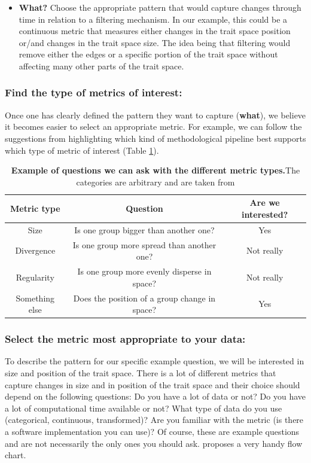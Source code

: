 \documentclass[12pt,letterpaper]{article}
\begin{document}
\begin{itemize}
    \item \textbf{What?} Choose the appropriate pattern that would capture changes through time in relation to a filtering mechanism. In our example, this could be a continuous metric that measures either changes in the trait space position or/and changes in the trait space size. The idea being that filtering would remove either the edges or a specific portion of the trait space without affecting many other parts of the trait space.
\end{itemize}


\subsubsection{Find the type of metrics of interest:}

Once one has clearly defined the pattern they want to capture (\textbf{what}), we believe it becomes easier to select an appropriate metric.
For example, we can follow the suggestions from \cite{mammola2021concepts} highlighting which kind of methodological pipeline best supports which type of metric of interest (Table \ref{Tab:box2}).

\begin{table}
\center
\begin{tabular}{c | c | c}
\textbf{Metric type}  & \textbf{Question} & \textbf{Are we interested?}\\
\hline
Size & Is one group bigger than another one? & Yes \\
Divergence & Is one group more spread than another one? & Not really \\
Regularity & Is one group more evenly disperse in space? & Not really \\
Something else & Does the position of a group change in space? & Yes \\
\end{tabular}
\caption{\textbf{Example of questions we can ask with the different metric types.}The categories are arbitrary and are taken from \cite{mammola2021concepts}}
\label{Tab:box2}
\end{table}


\subsubsection{Select the metric most appropriate to your data:}

To describe the pattern for our specific example question, we will be interested in size and position of the trait space.
There is a lot of different metrics that capture changes in size and in position of the trait space and their choice should depend on the following questions:
Do you have a lot of data or not?
Do you have a lot of computational time available or not?
What type of data do you use (categorical, continuous, transformed)?
Are you familiar with the metric (is there a software implementation you can use)?
Of course, these are example questions and are not necessarily the only ones you should ask.
\cite{mammola2021concepts} proposes a very handy flow chart.
\end{document}
